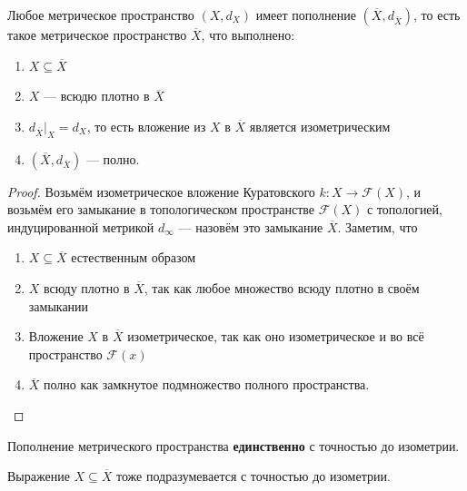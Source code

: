 \documentclass[11pt]{article}
\begin{document}
    \begin{Theorem}
    Любое метрическое пространство $(X, d_X)$ имеет пополнение $(\overline{X}, d_{\overline{X}})$, то есть такое метрическое пространство $\overline{X}$, что выполнено:
    \begin{enumerate}
        \item $X \subseteq \overline{X}$
        \item $X$ --- всюдю плотно в $\overline{X}$
        \item $d_{\overline{X}}|_X = d_X$, то есть вложение из $X$ в $\overline{X}$ является изометрическим
        \vspace{3pt}
        \item $(\overline{X}, d_{\overline{X}})$ --- полно.
    \end{enumerate}
    \end{Theorem}
    \begin{proof}
    Возьмём изометрическое вложение Куратовского $k: X \to \mathcal{F}(X)$, и возьмём его замыкание в топологическом пространстве $\mathcal{F}(X)$ с топологией, индуцированной метрикой $d_{\infty}$ --- назовём это замыкание $\overline{X}$. Заметим, что
    \begin{enumerate}
        \item $X \subseteq \overline{X}$ естественным образом
        \item $X$ всюду плотно в $\overline{X}$, так как любое множество всюду плотно в своём замыкании
        \item Вложение $X$ в $\overline{X}$ изометрическое, так как оно изометрическое и во всё пространство $\mathcal{F}(x)$
        \item $\overline{X}$ полно как замкнутое подмножество полного пространства.
    \end{enumerate}
    \end{proof}


    \begin{remark}
    Пополнение метрического пространства \textbf{единственно} с точностью до изометрии.
    \end{remark}

    \begin{remark}
    Выражение $X \subseteq \overline{X}$ тоже подразумевается с точностью до изометрии.
    \end{remark}
\end{document}
